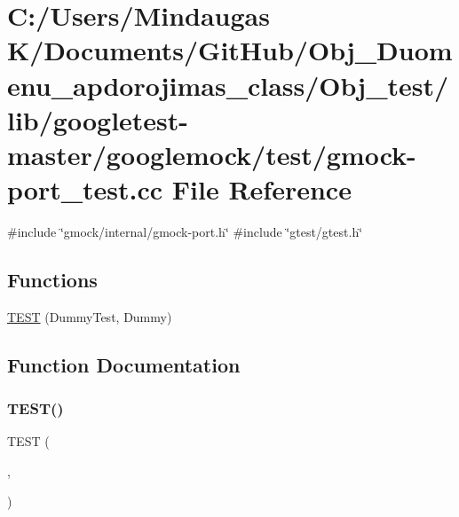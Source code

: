 \hypertarget{_obj__test_2lib_2googletest-master_2googlemock_2test_2gmock-port__test_8cc}{}\section{C\+:/\+Users/\+Mindaugas K/\+Documents/\+Git\+Hub/\+Obj\+\_\+\+Duomenu\+\_\+apdorojimas\+\_\+class/\+Obj\+\_\+test/lib/googletest-\/master/googlemock/test/gmock-\/port\+\_\+test.cc File Reference}
\label{_obj__test_2lib_2googletest-master_2googlemock_2test_2gmock-port__test_8cc}
{\ttfamily \#include \char`\"{}gmock/internal/gmock-\/port.\+h\char`\"{}}\newline
{\ttfamily \#include \char`\"{}gtest/gtest.\+h\char`\"{}}\newline
\subsection*{Functions}
\begin{DoxyCompactItemize}
\item 
\mbox{\hyperlink{_obj__test_2lib_2googletest-master_2googlemock_2test_2gmock-port__test_8cc_a63812c9ef0cbc6907a251ccf919da78e}{T\+E\+ST}} (Dummy\+Test, Dummy)
\end{DoxyCompactItemize}


\subsection{Function Documentation}
\mbox{\label{_obj__test_2lib_2googletest-master_2googlemock_2test_2gmock-port__test_8cc_a63812c9ef0cbc6907a251ccf919da78e}} 
\subsubsection{\texorpdfstring{TEST()}{TEST()}}
{\footnotesize\ttfamily T\+E\+ST (\begin{DoxyParamCaption}\item[{Dummy\+Test}]{,  }\item[{Dummy}]{ }\end{DoxyParamCaption})}

